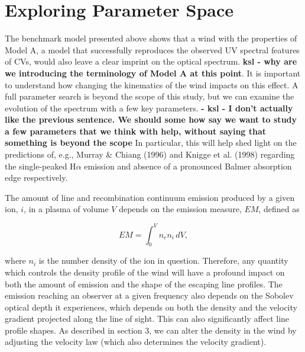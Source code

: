 \documentclass[preprint, a4paper, 11pt]{aastex}
\begin{document}
{%








%
%

\section{Exploring Parameter Space}

The benchmark model presented above shows that a wind with the properties
of Model A, a model that successfully reproduces the observed UV spectral features
of CVs,  
would also leave a clear imprint on the optical spectrum. {\bf ksl - why are we introducing the terminology of Model A at this point}. It is important
to understand how changing the kinematics of the wind impacts on this
effect.   
A full parameter search is beyond the scope of this study, 
but we can examine the evolution
of the spectrum with a few key parameters. {\bf - ksl - I don't actually like the previous sentence.  We should some how say we want to study a few parameters that we think with help,
without saying that something is beyond the scope}  In particular, this
will help shed light on the predictions of, e.g., Murray \& Chiang (1996)
and Knigge et al. (1998) regarding the single-peaked H$\alpha$ emission
and absence of a pronounced Balmer absorption edge respectively.

The amount of line and recombination continuum
emission produced by a given ion, $i$, in a plasma of volume $V$
depends on the emission measure, $EM$, defined as

\begin{equation}
EM=\int^V_0 n_e n_i \,dV,
\end{equation}


where $n_i$ is the number density of the ion in question.    
Therefore, any quantity which controls the density profile of the wind
will have a profound impact on both the 
amount of emission and the shape of the escaping line profiles.
The emission reaching an observer at a given frequency
also depends on the Sobolev optical depth it experiences, which depends on both
the density and the velocity gradient projected
along the line of sight. This can also significantly affect line profile shapes.       
As described in section 3, we can alter the density in the wind by 
adjusting the velocity law (which also determines the velocity gradient). 

}
\end{document}
